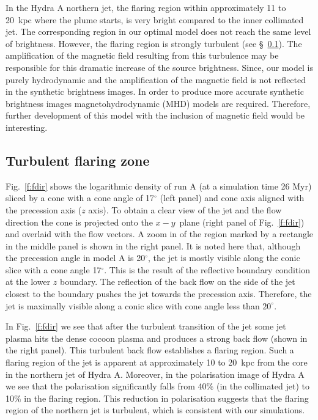 \documentclass[useAMS, usenatbib]{mn2e}
\begin{document}
In the Hydra A northern jet, the flaring region within approximately 11 to 20~kpc where the plume starts, is very bright compared to the inner collimated jet. The corresponding region in our optimal model does not reach the same level of brightness. However, the flaring region is strongly turbulent (see \S~\ref{flaring}).
The amplification of the magnetic field resulting from this turbulence may be responsible for this dramatic increase of the source brightness. Since, our model is purely hydrodynamic and the amplification of the magnetic field is not reflected in the synthetic brightness images. In order to produce more accurate synthetic brightness images magnetohydrodynamic (MHD) models are required. Therefore, further development of this model with the inclusion of magnetic field would be interesting. 

\subsection{Turbulent flaring zone}
\label{flaring}
Fig.~\ref{f:fdir} shows the logarithmic density of run A (at a simulation time 26 Myr) sliced by a cone with a cone angle of 17$^{\circ}$ (left panel) and cone axis aligned with the precession axis ($z$ axis). To obtain a clear view of the jet and the flow direction the cone is projected onto the $x-y$~plane (right panel of Fig.~\ref{f:fdir}) and overlaid with the flow vectors. A zoom in of the region marked by a rectangle in the middle panel is shown in the right panel. It is noted here that, although the precession angle in model A is 20$^{\circ}$, the jet is mostly visible along the conic slice with a cone angle 17$^{\circ}$. This is the result of the reflective boundary condition at the lower $z$ boundary. The reflection of the back flow on the side of the jet closest to the boundary pushes the jet towards the precession axis. Therefore, the jet is maximally visible along a conic slice with cone angle less than $20^{\circ}$. 

In Fig.~\ref{f:fdir} we see that after the turbulent transition of the jet some jet plasma hits the dense cocoon plasma and produces a strong back flow (shown in the right panel). This turbulent back flow  establishes a flaring region. Such a flaring region of the jet is apparent at approximately 10 to 20~kpc from the core in the northern jet of Hydra A.
 Moreover, in the polarisation image of Hydra A \citep{taylor90} we see that the polarisation significantly falls from 40$\%$ (in the collimated jet) to 10$\%$ in the flaring region. This reduction in polarisation suggests that the flaring region of the northern jet is turbulent, which is consistent with our simulations.  
\end{document}
